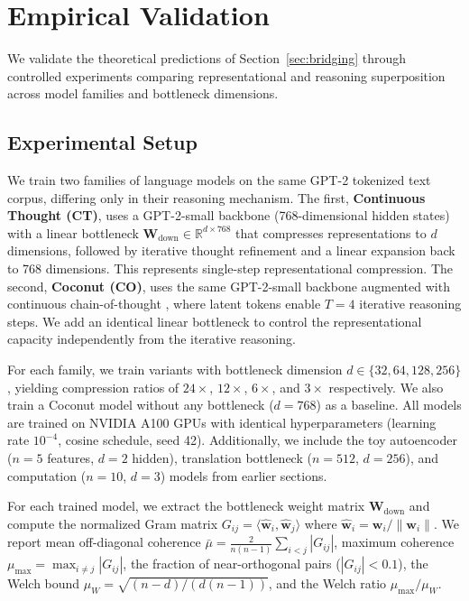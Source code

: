 \section{Empirical Validation}
\label{sec:empirical}

We validate the theoretical predictions of Section~\ref{sec:bridging} through controlled experiments comparing representational and reasoning superposition across model families and bottleneck dimensions.

\subsection{Experimental Setup}

We train two families of language models on the same GPT-2 tokenized text corpus, differing only in their reasoning mechanism. The first, \textbf{Continuous Thought (CT)}, uses a GPT-2-small backbone (768-dimensional hidden states) with a linear bottleneck $\mathbf{W}_{\text{down}} \in \mathbb{R}^{d \times 768}$ that compresses representations to $d$ dimensions, followed by iterative thought refinement and a linear expansion back to 768 dimensions. This represents single-step representational compression. The second, \textbf{Coconut (CO)}, uses the same GPT-2-small backbone augmented with continuous chain-of-thought \citep{hao2024training}, where latent tokens enable $T=4$ iterative reasoning steps. We add an identical linear bottleneck to control the representational capacity independently from the iterative reasoning.

For each family, we train variants with bottleneck dimension $d \in \{32, 64, 128, 256\}$, yielding compression ratios of $24\times$, $12\times$, $6\times$, and $3\times$ respectively. We also train a Coconut model without any bottleneck ($d = 768$) as a baseline. All models are trained on NVIDIA A100 GPUs with identical hyperparameters (learning rate $10^{-4}$, cosine schedule, seed 42). Additionally, we include the toy autoencoder ($n=5$ features, $d=2$ hidden), translation bottleneck ($n=512$, $d=256$), and computation ($n=10$, $d=3$) models from earlier sections.

For each trained model, we extract the bottleneck weight matrix $\mathbf{W}_{\text{down}}$ and compute the normalized Gram matrix $G_{ij} = \langle \hat{\mathbf{w}}_i, \hat{\mathbf{w}}_j \rangle$ where $\hat{\mathbf{w}}_i = \mathbf{w}_i / \|\mathbf{w}_i\|$. We report mean off-diagonal coherence $\bar{\mu} = \frac{2}{n(n-1)} \sum_{i < j} |G_{ij}|$, maximum coherence $\mu_{\max} = \max_{i \neq j} |G_{ij}|$, the fraction of near-orthogonal pairs ($|G_{ij}| < 0.1$), the Welch bound $\mu_W = \sqrt{(n-d)/(d(n-1))}$, and the Welch ratio $\mu_{\max} / \mu_W$.

